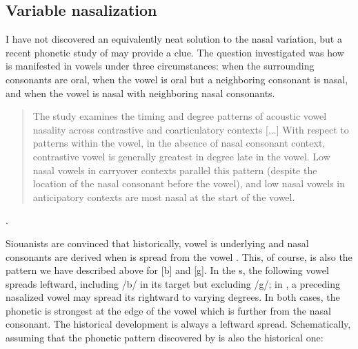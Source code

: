 \documentclass[output=paper]{LSP/langsci}
\begin{document}
\subsection{Variable nasalization}

I have not discovered an equivalently neat solution to the nasal variation, but a recent phonetic study of   \citep{ScarboroughetalInPress} may provide a clue. The question investigated was how  is manifested in  vowels under three circumstances: when the surrounding consonants are oral, when the vowel is oral but a neighboring consonant is nasal, and when the vowel is nasal with neighboring nasal consonants. \begin{quote}The study examines the timing and degree patterns of acoustic vowel nasality across contrastive and coarticulatory contexts [...] With respect to patterns within the vowel, in the absence of nasal consonant context, contrastive vowel  is generally greatest in degree late in the vowel. Low nasal vowels in carryover contexts parallel this pattern (despite the location of the nasal consonant before the vowel), and low nasal vowels in anticipatory contexts are most nasal at the start of the vowel.\end{quote} \citep{ScarboroughetalInPress}.

Siouanists are convinced that historically, vowel  is underlying and nasal consonants are derived when  is spread from the vowel \citep{RankinEtAl1998}. This, of course, is also the pattern we have described above for [b] and [g]. In the  s, the following vowel spreads  leftward, including /b/ in its target but excluding /g/; in , a preceding nasalized vowel may spread its  rightward to varying degrees. In both cases, the phonetic  is strongest at the edge of the vowel which is further from the nasal consonant. The historical development is always a leftward spread. Schematically, assuming that the phonetic pattern discovered by \citet{ScarboroughetalInPress} is also the historical one:
\end{document}
